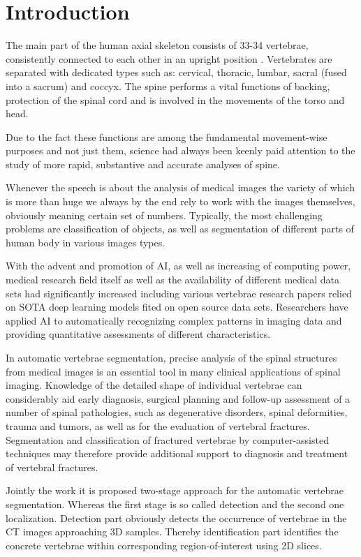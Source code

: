 \chapter{Introduction}
\label{ch:introduction}

The main part of the human axial skeleton consists of 33-34 vertebrae, consistently connected to each other in an upright position \cite{Ahlberg2005}. Vertebrates are separated with dedicated types such as: cervical, thoracic, lumbar, sacral (fused into a sacrum) and coccyx. The spine performs a vital functions of backing, protection of the spinal cord and is involved in the movements of the torso and head.  
 
Due to the fact these functions are among the fundamental movement-wise purposes and not just them, science had always been keenly paid attention to the study of more rapid, substantive and accurate analyses of spine.  
 
Whenever the speech is about the analysis of medical images the variety of which is more than huge we always by the end rely to work with the images themselves, obviously meaning certain set of numbers. Typically, the most challenging problems are classification of objects, as well as segmentation of different parts of human body in various images types.  
 
With the advent and promotion of AI, as well as increasing of computing power, \cite{Pham2000} medical research field itself as well as the availability of different medical data sets had significantly increased including various vertebrae research papers relied on SOTA deep learning models fited on open source data sets. Researchers have applied AI to automatically recognizing complex patterns in imaging data and providing quantitative assessments of different characteristics.  
 
In automatic vertebrae segmentation, precise analysis of the spinal structures from medical images is an essential tool in many clinical applications of spinal imaging. Knowledge of the detailed shape of individual vertebrae can considerably aid early diagnosis, surgical planning and follow-up assessment of a number of spinal pathologies, such as degenerative disorders, spinal deformities, trauma and tumors, as well as for the evaluation of vertebral fractures. Segmentation and classification of fractured vertebrae by computer-assisted techniques may therefore provide additional support to diagnosis and treatment of vertebral fractures. 

Jointly the work it is proposed two-stage approach for the automatic vertebrae segmentation. Whereas the first stage is so called detection and the second one localization. 
Detection part obviously detects the occurrence of vertebrae in the CT images approaching 3D samples. Thereby identification part identifies the concrete vertebrae within corresponding region-of-interest using 2D slices.